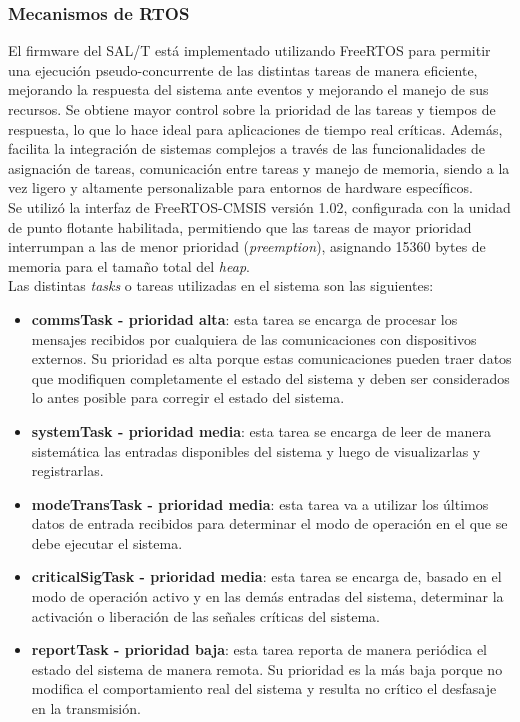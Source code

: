 \subsubsection{Mecanismos de RTOS}

El firmware del SAL/T está implementado utilizando FreeRTOS \cite{freertos} para permitir una ejecución pseudo-concurrente de las distintas tareas de manera eficiente, mejorando la respuesta del sistema ante eventos y mejorando el manejo de sus recursos. Se obtiene mayor control sobre la prioridad de las tareas y tiempos de respuesta, lo que lo hace ideal para aplicaciones de tiempo real críticas. Además, facilita la integración de sistemas complejos a través de las funcionalidades de asignación de tareas, comunicación entre tareas y manejo de memoria, siendo a la vez ligero y altamente personalizable para entornos de hardware específicos. \\ 


Se utilizó la interfaz de FreeRTOS-CMSIS versión 1.02, configurada con la unidad de punto flotante habilitada, permitiendo que las tareas de mayor prioridad interrumpan a las de menor prioridad (\textit{preemption}), asignando 15360 bytes de memoria para el tamaño total del \textit{heap}. \\

Las distintas \textit{tasks} o tareas utilizadas en el sistema son las siguientes: 

\begin{itemize}
    \item \textbf{commsTask - prioridad alta}: esta tarea se encarga de procesar los mensajes recibidos por cualquiera de las comunicaciones con dispositivos externos. Su prioridad es alta porque estas comunicaciones pueden traer datos que modifiquen completamente el estado del sistema y deben ser considerados lo antes posible para corregir el estado del sistema. 
    \item \textbf{systemTask - prioridad media}: esta tarea se encarga de leer de manera sistemática las entradas disponibles del sistema y luego de visualizarlas y registrarlas. 
    \item \textbf{modeTransTask - prioridad media}: esta tarea va a utilizar los últimos datos de entrada recibidos para determinar el modo de operación en el que se debe ejecutar el sistema.
    \item \textbf{criticalSigTask - prioridad media}: esta tarea se encarga de, basado en el modo de operación activo y en las demás entradas del sistema, determinar la activación o liberación de las señales críticas del sistema. 
    \item \textbf{reportTask - prioridad baja}: esta tarea reporta de manera periódica el estado del sistema de manera remota. Su prioridad es la más baja porque no modifica el comportamiento real del sistema y resulta no crítico el desfasaje en la transmisión. 
\end{itemize}


